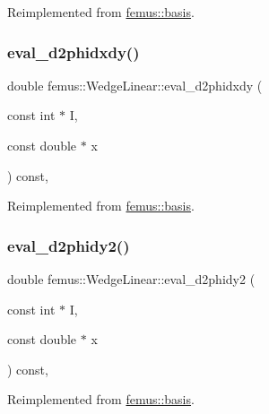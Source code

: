 Reimplemented from \mbox{\hyperlink{classfemus_1_1basis_a0a9839e75d1c9c8302486fc072eed028}{femus\+::basis}}.

\mbox{\label{classfemus_1_1_wedge_linear_a6b3c2d2415f2fc5c92e7c55a2726c481}} 
\subsubsection{\texorpdfstring{eval\+\_\+d2phidxdy()}{eval\_d2phidxdy()}}
{\footnotesize\ttfamily double femus\+::\+Wedge\+Linear\+::eval\+\_\+d2phidxdy (\begin{DoxyParamCaption}\item[{const int $\ast$}]{I,  }\item[{const double $\ast$}]{x }\end{DoxyParamCaption}) const\hspace{0.3cm}{\ttfamily [inline]}, {\ttfamily [virtual]}}



Reimplemented from \mbox{\hyperlink{classfemus_1_1basis_ac9feaf9e60421143db2a3708f3c7fa48}{femus\+::basis}}.

\mbox{\label{classfemus_1_1_wedge_linear_aa175c8d902c2a4a511d6bf798fb003c3}} 
\subsubsection{\texorpdfstring{eval\+\_\+d2phidy2()}{eval\_d2phidy2()}}
{\footnotesize\ttfamily double femus\+::\+Wedge\+Linear\+::eval\+\_\+d2phidy2 (\begin{DoxyParamCaption}\item[{const int $\ast$}]{I,  }\item[{const double $\ast$}]{x }\end{DoxyParamCaption}) const\hspace{0.3cm}{\ttfamily [inline]}, {\ttfamily [virtual]}}



Reimplemented from \mbox{\hyperlink{classfemus_1_1basis_a0febb29fe4b32213ff8d6d428f7241cd}{femus\+::basis}}.

